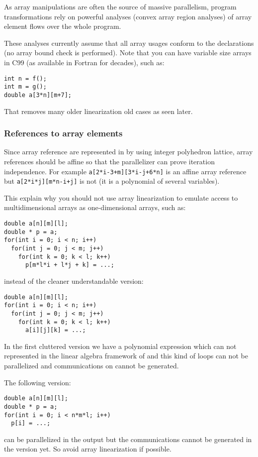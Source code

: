 \documentclass[a4paper]{article}
\begin{document}
As array manipulations are often the source of massive parallelism, \Apips
program transformations rely on powerful analyses (convex array region
analyses) of array element flows over the whole program.

These analyses currently assume that all array usages conform to the
declarations (no array bound check is performed). Note that you can have
variable size arrays in C99 (as available in Fortran for decades), such
as:
\begin{lstlisting}
int n = f();
int m = g();
double a[3*n][m+7];
\end{lstlisting}
That removes many older linearization old cases as seen later.


\subsubsection{References to array elements}
\label{sec:refer-array-elem}

Since array reference are represented in \Apips by using integer
polyhedron lattice, array references should be affine so that the
parallelizer can prove iteration independence. For example
\lstinline|a[2*i-3+m][3*i-j+6*n]| is an affine array reference but
\lstinline|a[2*i*j][m*n-i+j]| is not (it is a polynomial of several
variables).

This explain why you should not use array linearization to emulate
access to multidimensional arrays as one-dimensional arrays, such as:
\begin{lstlisting}
double a[n][m][l];
double * p = a;
for(int i = 0; i < n; i++)
  for(int j = 0; j < m; j++)
    for(int k = 0; k < l; k++)
      p[m*l*i + l*j + k] = ...;
\end{lstlisting}
instead of the cleaner understandable version:
\begin{lstlisting}
double a[n][m][l];
for(int i = 0; i < n; i++)
  for(int j = 0; j < m; j++)
    for(int k = 0; k < l; k++)
      a[i][j][k] = ...;
\end{lstlisting}
In the first cluttered version we have a polynomial expression which can
not represented in the linear algebra framework of \Apips and this kind of
loops can not be parallelized and communications on \Agpu cannot be
generated.

The following version:
\begin{lstlisting}
double a[n][m][l];
double * p = a;
for(int i = 0; i < n*m*l; i++)
  p[i] = ...;
\end{lstlisting}
can be parallelized in the \Aopenmp output but the communications cannot
be generated in the \Agpu version yet. So avoid array linearization if
possible.
\end{document}
